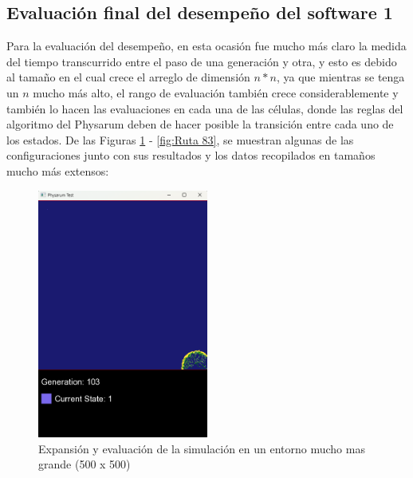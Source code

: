 \subsection{Evaluaci\'on final del desempe\~no del software 1}
    Para la evaluaci\'on del desempe\~no, en esta ocasi\'on fue
        mucho m\'as claro la medida del tiempo transcurrido entre el
        paso de una generaci\'on y otra, y esto es debido al tama\~no en
        el cual crece el arreglo de dimensi\'on $n * n$, ya que mientras
        se tenga un $n$ mucho m\'as alto, el rango de evaluaci\'on
        tambi\'en crece considerablemente y tambi\'en lo hacen las
        evaluaciones en cada una de las c\'elulas, donde las reglas del
        algoritmo del Physarum deben de hacer posible la transici\'on
        entre cada uno de los estados.
    \vskip 0.5cm
    De las Figuras \ref{fig:Ruta 79} - \ref{fig:Ruta 83}, se muestran algunas de las configuraciones
    junto con sus resultados y los datos recopilados en tama\~nos
    mucho m\'as extensos:
    \vskip 0.5cm
    \begin{figure}[htbp]
        \centering
        \includegraphics[width=0.5\textwidth]{./images/Pruebas/simulador/image079.png}
        \caption{Expansi\'on y evaluaci\'on de la simulaci\'on en un entorno mucho mas grande (500 x 500)}
        \label{fig:Ruta 79}
    \end{figure}
    \vskip 0.5cm
